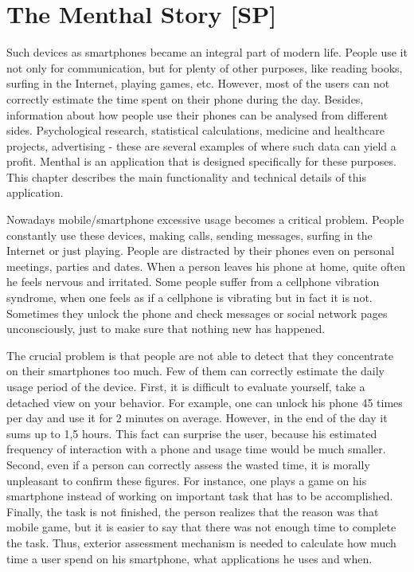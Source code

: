 \chapter{The Menthal Story [SP]}
\label{chap:menthal_story}
Such devices as smartphones became an integral part of modern life.
People use it not only for communication, but for plenty of other purposes, like reading books, surfing in the Internet, playing games, etc.
However, most of the users can not correctly estimate the time spent on their phone during the day.
Besides, information about how people use their phones can be analysed from different sides.
Psychological research, statistical calculations, medicine and healthcare projects, advertising - these are several examples of where such data can yield a profit.
Menthal is an application that is designed specifically for these purposes.
This chapter describes the main functionality and technical details of this application.

Nowadays mobile/smartphone excessive usage becomes a critical problem.
People constantly use these devices, making calls, sending messages, surfing in the Internet or just playing.
People are distracted by their phones even on personal meetings, parties and dates.
When a person leaves his phone at home, quite often he feels nervous and irritated.
Some people suffer from a cellphone vibration syndrome, when one feels as if a cellphone is vibrating but in fact it is not.
Sometimes they unlock the phone and check messages or social network pages unconsciously, just to make sure that nothing new has happened. 

The crucial problem is that people are not able to detect that they concentrate on their smartphones too much.
Few of them can correctly estimate the daily usage period of the device.
First, it is difficult to evaluate yourself, take a detached view on your behavior.
For example, one can unlock his phone 45 times per day and use it for 2 minutes on average.
However, in the end of the day it sums up to 1,5 hours.
This fact can surprise the user, because his estimated frequency of interaction with a phone and usage time would be much smaller.
Second, even if a person can correctly assess the wasted time, it is morally unpleasant to confirm these figures.
For instance, one plays a game on his smartphone instead of working on important task that has to be accomplished.
Finally, the task is not finished, the person realizes that the reason was that mobile game, but it is easier to say that there was not enough time to complete the task.  
Thus, exterior assessment mechanism is needed to calculate how much time a user spend on his smartphone, what applications he uses and when.    

